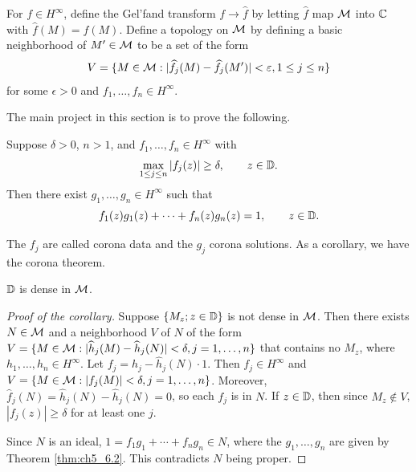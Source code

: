 For $f \in H^\infty$, define the Gel'fand transform $f \to \widehat{f}$ by letting $\widehat{f}$ map $\mathcal{M}$ into $\mathbb{C}$ with $\widehat{f}(M) = f(M)$. Define a topology on $\mathcal{M}$ by defining a basic neighborhood of $M' \in \mathcal{M}$ to be a set of the form
\[
    V = \{M \in \mathcal{M} : |\widehat{f}_j(M) - \widehat{f}_j(M')| < \varepsilon, 1 \leq j \leq n\}
\]
for some $\epsilon > 0$ and $f_1,\ldots,f_n \in H^\infty$.

The main project in this section is to prove the following.

\begin{theorem}\label{thm:ch5_6.2}
Suppose $\delta > 0$, $n > 1$, and $f_1,\ldots,f_n \in H^\infty$ with
\begin{equation}\label{eq:ch5_6.1}
    \max_{1\leq j\leq n} |f_j(z)| \geq \delta, \qquad z \in \mathbb{D}.
\end{equation}
Then there exist $g_1,\ldots,g_n \in H^\infty$ such that
\begin{equation}\label{eq:ch5_6.2}
    f_1(z)g_1(z) + \cdots + f_n(z)g_n(z) = 1, \qquad z \in \mathbb{D}.
\end{equation}
\end{theorem}

The $f_j$ are called corona data and the $g_j$ corona solutions. As a corollary, we have the corona theorem.

\begin{corollary}\label{cor:ch5_6.3}
$\mathbb{D}$ is dense in $\mathcal{M}$.
\end{corollary}

\begin{proof}[Proof of the corollary]
Suppose $\{M_z; z \in \mathbb{D}\}$ is not dense in $\mathcal{M}$. Then there exists $N \in \mathcal{M}$ and a neighborhood $V$ of $N$ of the form $V = \{M \in \mathcal{M} : |\widehat{h}_j(M) - \widehat{h}_j(N)| < \delta, j=1,\ldots,n\}$ that contains no $M_z$, where $h_1,\ldots,h_n \in H^\infty$. Let $f_j = h_j - \widehat{h}_j(N)\cdot 1$. Then $f_j \in H^\infty$ and $V = \{M \in \mathcal{M} : |f_j(M)| < \delta, j=1,\ldots,n\}$. Moreover, $\widehat{f}_j(N) = \widehat{h}_j(N) - \widehat{h}_j(N) = 0$, so each $f_j$ is in $N$. If $z \in \mathbb{D}$, then since $M_z \notin V$, $|f_j(z)| \geq \delta$ for at least one $j$.

Since $N$ is an ideal, $1 = f_1g_1 + \cdots + f_ng_n \in N$, where the $g_1,\ldots,g_n$ are given by Theorem \ref{thm:ch5_6.2}. This contradicts $N$ being proper.
\end{proof}


